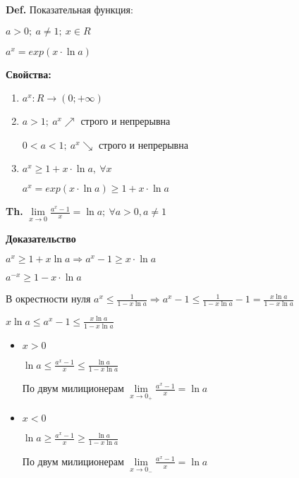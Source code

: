 \documentclass[14pt, letter paper]{article}
\begin{document}
\vspace{5mm}

\textbf{Def.} Показательная функция:

$a > 0;\ a \neq 1;\ x \in R$

$a^x = exp(x \cdot \ln{a})$

\textbf{Свойства:}

\begin{enumerate}
    \item $a^x : R \rightarrow (0; + \infty)$

    \item $a > 1;\ a^x \nearrow$ строго и непрерывна

    $0 < a < 1;\ a^x \searrow$ строго и непрерывна

    \item $a^x \geq 1 + x \cdot \ln{a},\ \forall x$

    $a^x = exp(x \cdot \ln{a}) \geq 1 + x \cdot \ln{a}$
\end{enumerate}

\vspace{5mm}

\textbf{Th.} $\lim\limits_{x \rightarrow 0}{\frac{a^x - 1}{x}} = \ln{a};\ \forall a > 0, a \neq 1$

\begin{center}
    \textbf{Доказательство}
\end{center}

$a^x \geq 1 + x \ln{a} \Rightarrow a^x - 1 \geq x \cdot \ln{a}$

$a^{-x} \geq 1 - x \cdot \ln{a}$

В окрестности нуля $a^x \leq \frac{1}{1 - x \ln{a}} \Rightarrow a^x - 1 \leq \frac{1}{1 - x\ln{a}} - 1 = \frac{x\ln{a}}{1 - x\ln{a}}$

$x\ln{a} \leq a^x - 1 \leq \frac{x\ln{a}}{1 - x\ln{a}}$

\begin{itemize}
    \item $x > 0$

    $\ln{a} \leq \frac{a^x-1}{x} \leq \frac{\ln{a}}{1 - x\ln{a}}$

    По двум милиционерам $\lim\limits_{x \rightarrow 0_+}{\frac{a^x-1}{x}} = \ln{a}$

    \item $x < 0$

    $\ln{a} \geq \frac{a^x-1}{x} \geq \frac{\ln{a}}{1 - x\ln{a}}$

    По двум милиционерам $\lim\limits_{x \rightarrow 0_-}{\frac{a^x-1}{x}} = \ln{a}$
\end{itemize}
\end{document}
